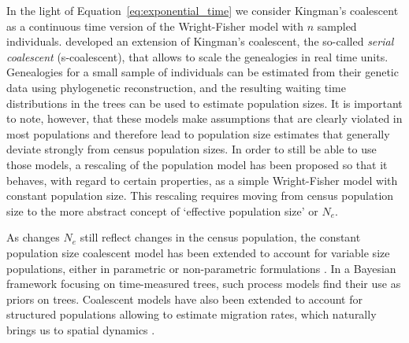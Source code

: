 In the light of Equation~\ref{eq:exponential_time} we consider Kingman's coalescent as a continuous time version of the Wright-Fisher model with $n$ sampled individuals.
\cite{Rodrigo1999} developed an extension of Kingman's coalescent, the so-called \textit{serial coalescent} (s-coalescent), that allows to scale the genealogies in real time units.
Genealogies for a small sample of individuals can be estimated from their genetic data using phylogenetic reconstruction, and the resulting waiting time distributions in the trees can be used to estimate population sizes.
It is important to note, however, that these models make assumptions that are clearly violated in most populations and therefore lead to population size estimates that generally  deviate strongly from census population sizes. 
In order to still be able to use those models, a rescaling of the population model has been proposed so that it behaves, with regard to certain properties, as a simple Wright-Fisher model with constant population size.
This rescaling requires moving from census population size to the more abstract concept of `effective population size' or $N_{e}$.

As changes $N_{e}$ still reflect changes in the census population, the constant population size coalescent model has been extended to account for variable size populations, either in parametric \citep{Pybus2002} or non-parametric formulations \citep{Minin2008, Gill2013}. 
In a Bayesian framework focusing on time-measured trees, such process models find their use as priors on trees.
Coalescent models have also been extended to account for structured populations allowing to estimate migration rates, which naturally brings us to spatial dynamics \citep{Kuhner2006,migrate}.

